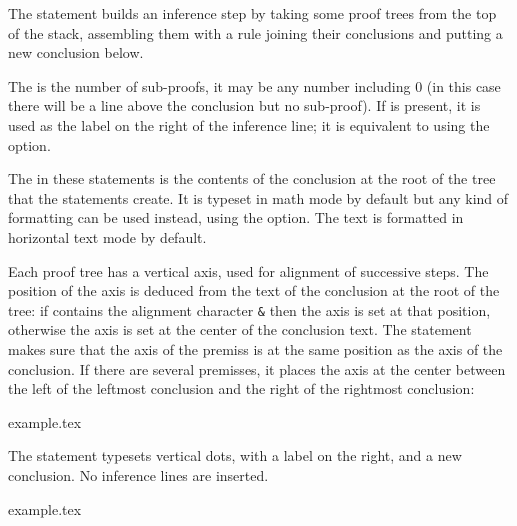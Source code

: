 \documentclass{l3doc}
\newenvironment{example}{%
  \VerbatimEnvironment
  \begin{VerbatimOut}{example.tex}}{%
  \end{VerbatimOut}
  \begin{center}
  \begin{minipage}{.4\textwidth}
    
  \end{minipage}%
  \begin{minipage}{.6\textwidth}
    \small\VerbatimInput[gobble=0]{example.tex}
  \end{minipage}%
  \end{center}
}
\begin{document}
\DescribeMacro{\infer}
The statement  builds an inference step by taking some proof trees
from the top of the stack, assembling them with a rule joining their
conclusions and putting a new conclusion below.
\begin{syntax}
\end{syntax}
The  is the number of sub-proofs, it may be any number
including 0 (in this case there will be a line above the conclusion but no
sub-proof).
If  is present, it is used as the label on the right of the
inference line; it is equivalent to using the  option.

\medskip

The  in these statements is the contents of the conclusion at the
root of the tree that the statements create.
It is typeset in math mode by default but any kind of formatting can be used
instead, using the  option.
The  text is formatted in horizontal text mode by default.

Each proof tree has a vertical axis, used for alignment of successive steps.
The position of the axis is deduced from the text of the conclusion at the
root of the tree: if  contains the alignment character \verb|&|
then the axis is set at that position, otherwise the axis is set at the center
of the conclusion text.
The  statement makes sure that the axis of the premiss is at the
same position as the axis of the conclusion.
If there are several premisses, it places the axis at the center between the
left of the leftmost conclusion and the right of the rightmost conclusion:

\begin{example}
  \begin{prooftree}
  \end{prooftree}
\end{example}

\DescribeMacro{\ellipsis}
The statement  typesets vertical dots, with a label on the right,
and a new conclusion. No inference lines are inserted.
\begin{syntax}
\end{syntax}
\begin{example}
  \begin{prooftree}
  \end{prooftree}
\end{example}
\end{document}
